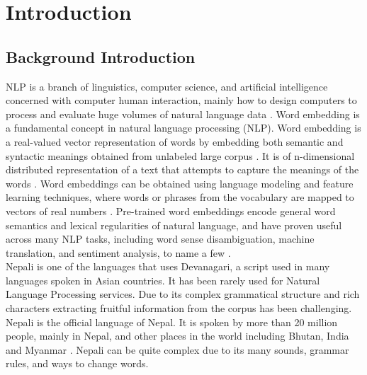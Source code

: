      \chapter{Introduction}
        \section{Background Introduction}
        NLP is a branch of linguistics, computer science, and artificial intelligence concerned with computer human interaction, mainly how to design computers to process and evaluate huge volumes of natural language data \cite{asudani2023impact}. Word embedding is a fundamental concept in natural language processing (NLP). Word embedding is a real-valued vector representation of words by embedding both semantic and syntactic meanings obtained from unlabeled large corpus \cite{Wang_Wang_Chen_Wang_Kuo_2019}. It is of n-dimensional distributed representation of a text that attempts to capture the meanings of the words \cite{asudani2023impact}. Word embeddings can be obtained using language modeling and feature learning techniques, where words or phrases from the vocabulary are mapped to vectors of real numbers \cite{enwiki:1219561882}. Pre-trained word embeddings encode general word semantics and lexical regularities of natural language, and have proven useful across many NLP tasks, including word sense disambiguation, machine translation, and sentiment analysis, to name a few \cite{moreo2019wordclass}. \\ 
        Nepali is one of the languages that uses Devanagari, a script used in many languages spoken in Asian countries. It has been rarely used for Natural Language Processing services. Due to its complex grammatical structure and rich characters extracting fruitful information from the corpus has been challenging\cite{NepaliBERT}.
        Nepali is the official language of Nepal. It is spoken by more than 20 million people, mainly in Nepal, and other places in the world including Bhutan, India and Myanmar \cite{niraula2020linguistic}. Nepali can be quite complex due to its many sounds, grammar rules, and ways to change words.

